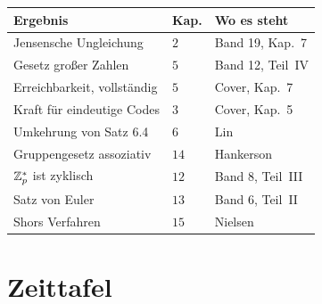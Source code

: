 \begin{merksatz}
\begin{center}
{\small
\renewcommand{\arraystretch}{1.5}
\begin{tabular}{@{}P{3.4cm}P{1.2cm}P{3.4cm}@{}}
\toprule
\textbf{Ergebnis} & \textbf{Kap.} & \textbf{Wo es steht}\\
\midrule
Jensensche Ungleichung & $2$ & Band 19, Kap.\ 7\\
Gesetz großer Zahlen & $5$ & Band 12, Teil~IV\\
Erreichbarkeit, vollständig & $5$ & Cover, Kap.\ 7\\
Kraft für eindeutige Codes & $3$ & Cover, Kap.\ 5\\
Umkehrung von Satz 6.4 & $6$ & Lin\\
Gruppengesetz assoziativ & $14$ & Hankerson\\
$\mathbb{Z}_p^{*}$ ist zyklisch & $12$ & Band 8, Teil~III\\
Satz von Euler & $13$ & Band 6, Teil~II\\
Shors Verfahren & $15$ & Nielsen\\
\bottomrule
\end{tabular}}
\end{center}

\begin{center}
\begin{minipage}{0.88\textwidth}
\end{minipage}
\end{center}
\end{merksatz}

\section{Zeittafel}

